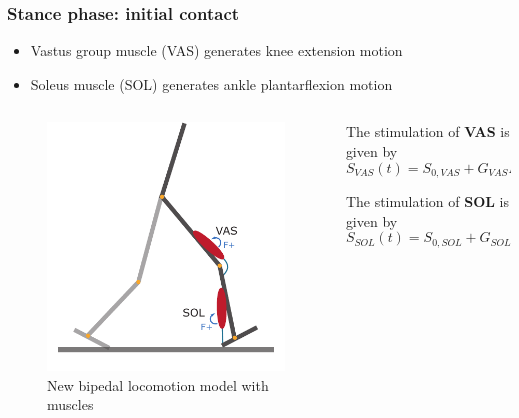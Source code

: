 \documentclass[10pt]{beamer}
\begin{document}
\begin{frame}
	\frametitle{Stance phase: initial contact}
	\begin{itemize}
		\item Vastus group muscle (VAS) generates knee extension motion
		\item Soleus muscle (SOL) generates ankle plantarflexion motion
	\end{itemize}

	\begin{columns}
		\begin{column}{.5\textwidth}
			\begin{figure}
				\centering
				\includegraphics[height=.45\textheight]{images/new_model/stance/muscle_vas_sol.pdf}
				\caption{New bipedal locomotion model with muscles}	
			\end{figure}
		\end{column}
		\begin{column}{.5\textwidth}
			\begin{block}{}
				The stimulation of \textbf{VAS} is given by
				\begin{equation*}
					S_{VAS}(t)=S_{0,VAS} + G_{VAS} F_{VAS} (t-\Delta t_{VAS})
				\end{equation*}
			\end{block}
			\begin{block}{}
				The stimulation of \textbf{SOL} is given by
				\begin{equation*}
					S_{SOL}(t)=S_{0,SOL} + G_{SOL} F_{SOL} (t-\Delta t_{SOL})
				\end{equation*}
			\end{block}		
		\end{column}
	\end{columns}
\end{frame}
\end{document}
